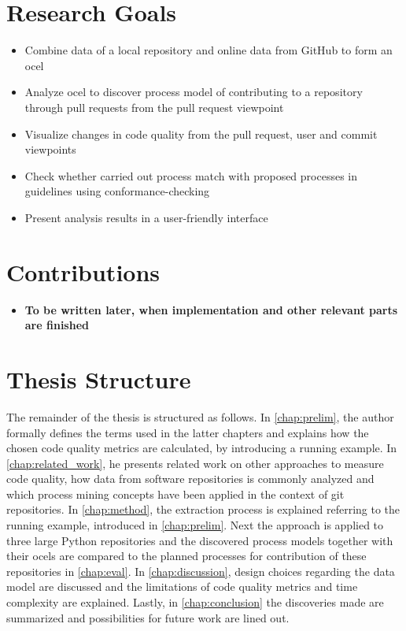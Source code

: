 \section{Research Goals}
\label{sec:intro_ssec:rgs}
\begin{itemize}
	\item Combine data of a local repository and online data from GitHub to form an \ac{ocel}
	\item Analyze \ac{ocel} to discover process model of contributing to a repository through pull requests from the pull request viewpoint
	\item Visualize changes in code quality from the pull request, user and commit viewpoints
	\item Check whether carried out process match with proposed processes in guidelines using conformance-checking
	\item Present analysis results in a user-friendly interface
\end{itemize}


\section{Contributions}
\label{sec:intro_ssec:c}
\begin{itemize}
	\item \textbf{To be written later, when implementation and other relevant parts are finished}
\end{itemize}


\section{Thesis Structure}
\label{sec:intro_ssec:ts}
The remainder of the thesis is structured as follows. In \cref{chap:prelim}, the author formally defines the terms used in the latter chapters and explains how the chosen code quality metrics are calculated, by introducing a running example. In \cref{chap:related_work}, he presents related work on other approaches to measure code quality, how data from software repositories is commonly analyzed and which process mining concepts have been applied in the context of git repositories. In \cref{chap:method}, the extraction process is explained referring to the running example, introduced in \cref{chap:prelim}. Next the approach is applied to three large Python repositories and the discovered process models together with their \acp{ocel} are compared to the planned processes for contribution of these repositories in \cref{chap:eval}. In \cref{chap:discussion}, design choices regarding the data model are discussed and the limitations of code quality metrics and time complexity are explained. Lastly, in \cref{chap:conclusion} the discoveries made are summarized and possibilities for future work are lined out.